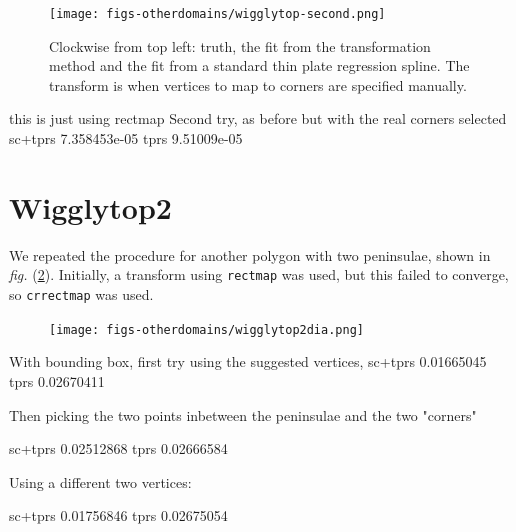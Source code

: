 \documentclass[a4paper,10pt]{amsart}
\newcommand{\fig}[1]{\emph{fig.} (\ref{#1})}
\begin{document}
\begin{figure}
\centering
\texttt{[image: figs-otherdomains/wigglytop-second.png]} \\
\caption{Clockwise from top left: truth, the fit from the transformation method and the fit from a standard thin plate regression spline. The transform is when vertices to map to corners are specified manually.}
\label{wigglyseccomp}
\end{figure}




this is just using rectmap
Second try, as before but with the real corners selected
sc+tprs 7.358453e-05 
tprs 9.51009e-05 




\section{Wigglytop2}

We repeated the procedure for another polygon with two peninsulae, shown in \fig{wigglytop2dia}. Initially, a transform using \texttt{rectmap} was used, but this failed to converge, so \texttt{crrectmap} was used.



\begin{figure}
\centering
\texttt{[image: figs-otherdomains/wigglytop2dia.png]} \\
\caption{}
\label{wigglytop2dia}
\end{figure}




With bounding box, first try using the suggested vertices, 
sc+tprs 0.01665045 
tprs 0.02670411 


Then picking the two points inbetween the peninsulae and the two "corners"

sc+tprs 0.02512868 
tprs 0.02666584 


Using a different two vertices:

sc+tprs 0.01756846 
tprs 0.02675054 




\end{document}
